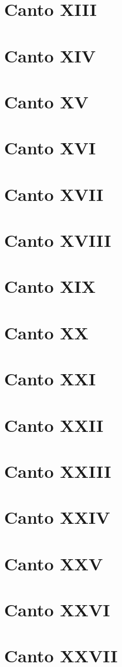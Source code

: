 \documentclass[12pt]{book}
\begin{document}
\chapter{Canto XIII}
\chapter{Canto XIV}
\chapter{Canto XV}
\chapter{Canto XVI}
\chapter{Canto XVII}
\chapter{Canto XVIII}
\chapter{Canto XIX}
\chapter{Canto XX}
\chapter{Canto XXI}
\chapter{Canto XXII}
\chapter{Canto XXIII}
\chapter{Canto XXIV}
\chapter{Canto XXV}
\chapter{Canto XXVI}
\chapter{Canto XXVII}
\end{document}
